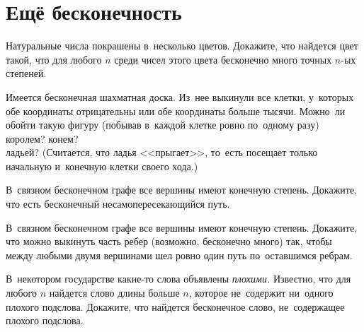
\section*{Ещё бесконечность}


\begin{problems}

\item
Натуральные числа покрашены в~несколько цветов.
Докажите, что найдется цвет такой, что для любого $n$ среди чисел этого цвета
бесконечно много точных $n$-ых степеней.

\item
Имеется бесконечная шахматная доска.
Из~нее выкинули все клетки, у~которых обе координаты отрицательны или обе
координаты больше тысячи.
Можно~ли обойти такую фигуру (побывав в~каждой клетке ровно по~одному разу)
\\
\subproblem королем?
\qquad
\subproblem конем?
\\
\subproblem ладьей?\enspace
(Считается, что ладья <<прыгает>>, то~есть посещает только начальную и~конечную
клетки своего хода.)

\item
В~связном бесконечном графе все вершины имеют конечную степень.
Докажите, что есть бесконечный несамопересекающийся путь.

\item
В~связном бесконечном графе все вершины имеют конечную степень.
Докажите, что можно выкинуть часть ребер (возможно, бесконечно много) так,
чтобы между любыми двумя вершинами шел ровно один путь по~оставшимся ребрам.

\item
В~некотором государстве какие-то слова объявлены \emph{плохими.}
Известно, что для любого $n$ найдется слово длины больше $n$, которое
не~содержит ни~одного плохого подслова.
Докажите, что найдется бесконечное слово, не~содержащее плохого подслова.

\end{problems}

